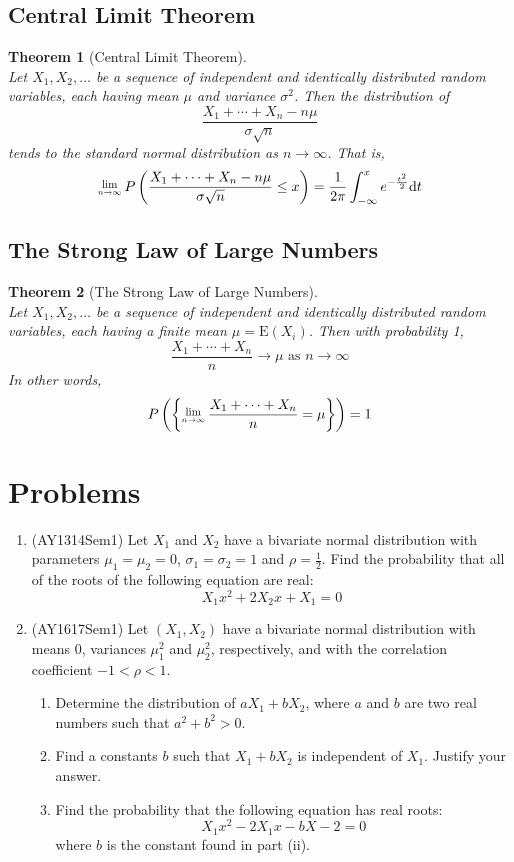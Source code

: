 \documentclass[12pt]{article}
\newcommand{\diff}{\mathrm{d}}
\newcommand{\expec}{\mathrm{E}}
\newcommand{\Lim}[1]{\raisebox{0.5ex}{\scalebox{0.8}{$\displaystyle \lim_{#1}\;$}}}
\newtheorem{theorem}{Theorem}[section]
\theoremstyle{definition}
\begin{document}
\subsection{Central Limit Theorem}
\begin{theorem}[Central Limit Theorem]
\hfill\\\normalfont Let $X_1,X_2,\ldots$ be a sequence of independent and identically distributed random variables, each having mean $\mu$ and variance $\sigma^2$. Then the distribution of 
\[
\frac{X_1+\cdots+X_n-n\mu}{\sigma\sqrt{n}}
\]
tends to the standard normal distribution as $n\to \infty$. That is,
\[
\Lim{n\to\infty}P\left(\frac{X_1+\cdots+X_n-n\mu}{\sigma\sqrt{n}}\leq x\right)=\frac{1}{2\pi}\int_{-\infty}^x e^{-\frac{t^2}{2}}\diff t
\]
\end{theorem}
\subsection{The Strong Law of Large Numbers}
\begin{theorem}[The Strong Law of Large Numbers]
\hfill\\\normalfont Let $X_1,X_2,\ldots$ be a sequence of independent and identically distributed random variables, each having a finite mean $\mu=\expec(X_i)$. Then with probability 1,
\[
\frac{X_1+\cdots+X_n}{n}\to \mu \text{ as }n\to\infty
\]
In other words,
\[
P\left(\left\{\Lim{n\to\infty}\frac{X_1+\cdots+X_n}{n}=\mu\right\}\right)=1
\]
\end{theorem}
\clearpage
\section{Problems}
\begin{enumerate}[label=\arabic*]
\item (AY1314Sem1) Let $X_1$ and $X_2$ have a bivariate normal distribution with parameters $\mu_1=\mu_2=0$, $\sigma_1=\sigma_2 = 1$ and $\rho = \frac{1}{2}$. Find the probability that all of the roots of the following equation are real:
\[
X_1x^2+2X_2x+X_1=0
\]
\item(AY1617Sem1) Let $(X_1,X_2)$ have a bivariate normal distribution with means $0$, variances $\mu_1^2$ and $\mu_2^2$, respectively, and with the correlation coefficient $-1<\rho<1$.
\begin{enumerate}
\item Determine the distribution of $aX_1+bX_2$, where $a$ and $b$ are two real numbers such that $a^2+b^2>0$.
\item Find a constants $b$ such that $X_1+bX_2$ is independent of $X_1$. Justify your answer.
\item Find the probability that the following equation has real roots:
\[
X_1x^2-2X_1x-bX-2=0
\]
where $b$ is the constant found in part (ii).
\end{enumerate}
\end{enumerate}
\end{document}
